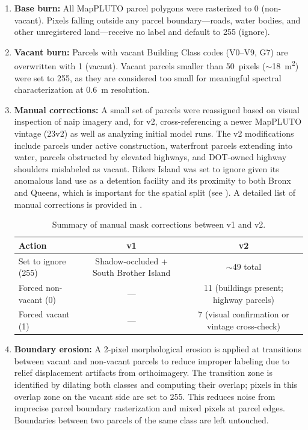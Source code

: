 \begin{enumerate}
  \item \textbf{Base burn:} All MapPLUTO parcel polygons were rasterized to 0 (non-vacant). Pixels falling outside any parcel boundary---roads, water bodies, and other unregistered land---receive no label and default to 255 (ignore).

  \item \textbf{Vacant burn:} Parcels with vacant Building Class codes (V0--V9, G7) are overwritten with 1 (vacant). Vacant parcels smaller than 50~pixels ($\sim$18~m\textsuperscript{2}) were set to 255, as they are considered too small for meaningful spectral characterization at 0.6~m resolution.

  \item \textbf{Manual corrections:} A small set of parcels were reassigned based on visual inspection of \acrshort{naip} imagery and, for v2, cross-referencing a newer MapPLUTO vintage (23v2) as well as analyzing initial model runs. The v2 modifications include parcels under active construction, waterfront parcels extending into water, parcels obstructed by elevated highways, and DOT-owned highway shoulders mislabeled as vacant. Rikers Island was set to ignore given its anomalous land use as a detention facility and its proximity to both Bronx and Queens, which is important for the spatial split (see ). A detailed list of manual corrections is provided in .

  \begin{table}[H]
    \centering
    \caption{Summary of manual mask corrections between v1 and v2.}
    \label{tab:mask_corrections}
    \begin{tabular}{lcc}
      \toprule
      \textbf{Action} & \textbf{v1} & \textbf{v2} \\
      \midrule
      Set to ignore (255)  & Shadow-occluded + South Brother Island & $\sim$49 total \\
      Forced non-vacant (0) & --- & 11 (buildings present; highway parcels) \\
      Forced vacant (1) & --- & 7 (visual confirmation or vintage cross-check) \\
      \bottomrule
    \end{tabular}
  \end{table}

  \item \textbf{Boundary erosion:} A 2-pixel morphological erosion is applied at transitions between vacant and non-vacant parcels to reduce improper labeling due to relief displacement artifacts from orthoimagery. The transition zone is identified by dilating both classes and computing their overlap; pixels in this overlap zone on the vacant side are set to 255. This reduces noise from imprecise parcel boundary rasterization and mixed pixels at parcel edges. Boundaries between two parcels of the same class are left untouched.


\end{enumerate}
